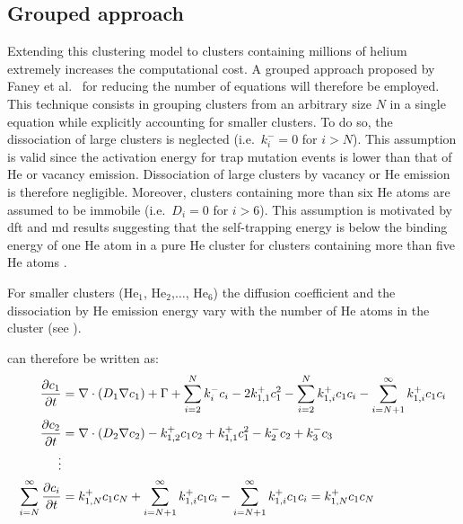 \subsection{Grouped approach}
Extending this clustering model to clusters containing millions of helium extremely increases the computational cost.
A grouped approach proposed by Faney et al.\  for reducing the number of equations will therefore be employed.
This technique consists in grouping clusters from an arbitrary size $N$ in a single equation while explicitly accounting for smaller clusters.
To do so, the dissociation of large clusters is neglected (i.e.\ $k_i^- = 0$ for $i>N$).
This assumption is valid since the activation energy for \gls{trap mutation} events is lower than that of He or \gls{vacancy} emission.
Dissociation of large clusters by \gls{vacancy} or He emission is therefore negligible.
Moreover, clusters containing more than six \gls{He} atoms are assumed to be immobile (i.e.\ $D_i = 0$ for $i>6$).
This assumption is motivated by \gls{dft} and \gls{md} results suggesting that the \gls{self-trapping} energy is below the binding energy of one He atom in a pure He cluster for clusters containing more than five He atoms .

For smaller clusters ($\mathrm{He}_1$, $\mathrm{He}_2$,$\ldots$, $\mathrm{He}_6$) the diffusion coefficient and the dissociation by He emission energy vary with the number of \gls{He} atoms in the cluster (see ).

 can therefore be written as:
\begin{subequations}
    \begin{align}
        \frac{\partial c_1}{\partial t} &= \nabla \cdot (D_1 \nabla c_1) + \Gamma + \sum\limits_{i=2}^N k_{i}^- c_i - 2k_{1, 1}^+ c_1^2 - \sum\limits_{i=2}^N k_{1,i}^+ c_1 c_i - \sum\limits_{i=N+1}^\infty k_{1,i}^+ c_1 c_i \\
        \frac{\partial c_2}{\partial t} &= \nabla \cdot (D_2 \nabla c_2) - k_{1, 2}^+ c_1 c_2 + k_{1, 1}^+ c_1^2 - k_{2}^- c_2 + k_{3}^- c_3\\
        \vdots \nonumber\\
        \sum\limits_{i=N}^\infty \frac{\partial c_{i}}{\partial t} &= k_{1, N}^+ c_1 c_N + \sum\limits_{i=N+1}^\infty k_{1, i}^+ c_1 c_i - \sum\limits_{i=N+1}^\infty k_{1, i}^+ c_1 c_i = k_{1, N}^+ c_1 c_N
    \end{align}
    \labeq{temporal evolution grouping no new symbols}
\end{subequations}

